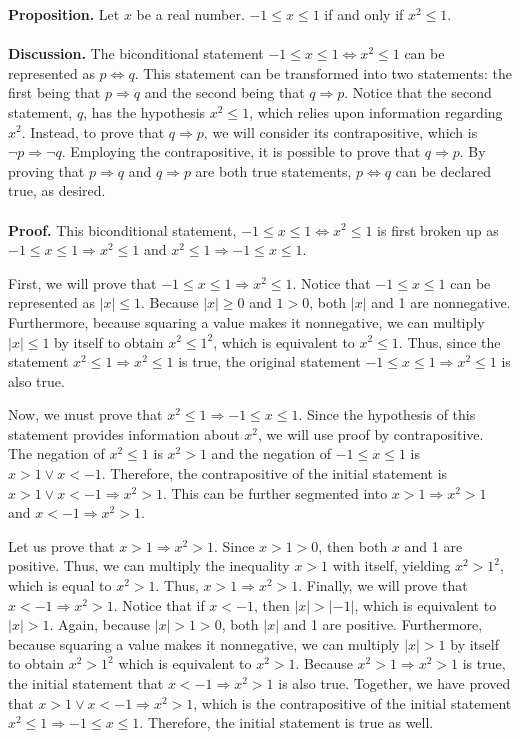 \documentclass[12pt]{exam}
\begin{document}
\begin{questions}
\question
\textbf{Proposition.} Let $x$ be a real number. $-1\leq x\leq1$ if and only if $x^2\leq1$.
\\
\\\textbf{Discussion.} The biconditional statement $-1\leq x\leq1 \Leftrightarrow x^2\leq1$ can be represented as $p\Leftrightarrow q$. This statement can be transformed into two statements: the first being that $p\Rightarrow q$ and the second being that $q\Rightarrow p$. Notice that the second statement, $q$, has the hypothesis $x^2\leq1$, which relies upon information regarding $x^2$. Instead, to prove that $q\Rightarrow p$, we will consider its contrapositive, which is $\neg p \Rightarrow \neg q$. Employing the contrapositive, it is possible to prove that  $q\Rightarrow p$. By proving that $p\Rightarrow q$ and $q\Rightarrow p$ are both true statements, $p\Leftrightarrow q$ can be declared true, as desired.
\\
\\\textbf{Proof.} This biconditional statement, $-1\leq x\leq1 \Leftrightarrow x^2\leq1$ is first broken up as $-1\leq x\leq1\Rightarrow x^2\leq1$ and $x^2\leq1\Rightarrow -1\leq x\leq1$. 
\par
First, we will prove that $-1\leq x\leq1\Rightarrow x^2\leq1$. Notice that $-1\leq x\leq1$ can be represented as $|x|\leq1$. Because $|x|\geq 0$ and $1>0$, both $|x|$ and 1 are nonnegative. Furthermore, because squaring a value makes it nonnegative, we can multiply $|x|\leq1$ by itself to obtain $x^2\leq1^2$, which is equivalent to $x^2\leq1$. Thus, since the statement  $x^2\leq1\Rightarrow x^2\leq1$ is true, the original statement $-1\leq x\leq1\Rightarrow x^2\leq1$ is also true. 
\par
Now, we must prove that $x^2\leq1\Rightarrow -1\leq x\leq1$. Since the hypothesis of this statement provides information about $x^2$, we will use proof by contrapositive. The negation of $x^2\leq1$ is $x^2>1$ and the negation of $-1\leq x\leq1$ is $x>1\vee x<-1$. Therefore, the contrapositive of the initial statement is $x>1 \vee x<-1 \Rightarrow x^2>1$. This can be further segmented into $x>1\Rightarrow x^2>1$ and $x<-1 \Rightarrow x^2>1$.
\par
Let us prove that $x>1\Rightarrow x^2>1$. Since $x>1>0$, then both $x$ and 1 are positive. Thus, we can multiply the inequality $x>1$ with itself, yielding $x^2>1^2$, which is equal to $x^2>1$. Thus, $x>1\Rightarrow x^2>1$. Finally, we will prove that $x<-1 \Rightarrow x^2>1$. Notice that if $x<-1$, then $|x|>|-1|$, which is equivalent to $|x|>1$. Again, because $|x|>1>0$, both $|x|$ and 1 are positive. Furthermore, because squaring a value makes it nonnegative, we can multiply  $|x|>1$ by itself to obtain $x^2>1^2$ which is equivalent to $x^2>1$. Because $x^2>1\Rightarrow x^2>1$ is true, the initial statement that $x<-1 \Rightarrow x^2>1$ is also true. Together, we have proved that  $x>1 \vee x<-1 \Rightarrow x^2>1$, which is the contrapositive of the initial statement $x^2\leq1\Rightarrow -1\leq x\leq1$. Therefore, the initial statement is true as well.

\end{questions}
\end{document}
